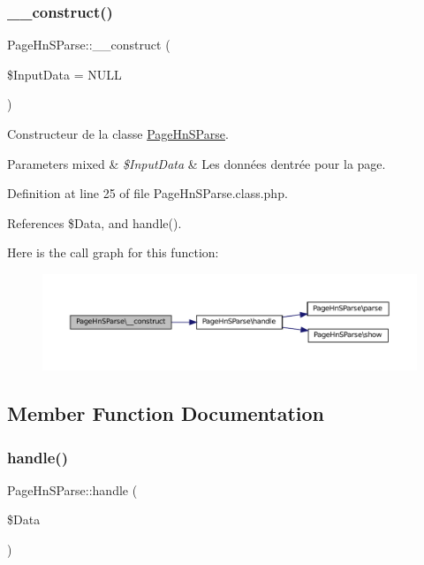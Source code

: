 \subsubsection{\texorpdfstring{\+\_\+\+\_\+construct()}{\_\_construct()}}
{\footnotesize\ttfamily Page\+Hn\+S\+Parse\+::\+\_\+\+\_\+construct (\begin{DoxyParamCaption}\item[{}]{\$\+Input\+Data = {\ttfamily NULL} }\end{DoxyParamCaption})}

Constructeur de la classe \hyperlink{class_page_hn_s_parse}{Page\+Hn\+S\+Parse}.


\begin{DoxyParams}[1]{Parameters}
mixed & {\em \$\+Input\+Data} & Les données d\textquotesingle{}entrée pour la page. \\
\hline
\end{DoxyParams}


Definition at line 25 of file Page\+Hn\+S\+Parse.\+class.\+php.



References \$\+Data, and handle().

Here is the call graph for this function\+:\nopagebreak
\begin{figure}[H]
\begin{center}
\leavevmode
\includegraphics[width=350pt]{class_page_hn_s_parse_a6cde58c60a6b752d06d900d52527ae8b_cgraph}
\end{center}
\end{figure}


\subsection{Member Function Documentation}
\mbox{\label{class_page_hn_s_parse_a4237724d654a67c55fa822c06b6ab7e4}} 
\subsubsection{\texorpdfstring{handle()}{handle()}}
{\footnotesize\ttfamily Page\+Hn\+S\+Parse\+::handle (\begin{DoxyParamCaption}\item[{}]{\$\+Data }\end{DoxyParamCaption})\hspace{0.3cm}{\ttfamily [protected]}}

